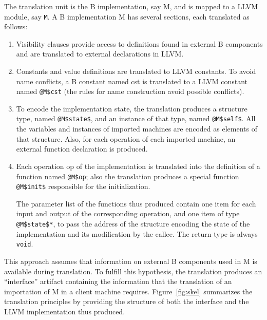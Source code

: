 \documentclass{llncs}
\newcommand{\llvm}[1]{\texttt{#1}}
\newcommand{\B}[1]{\textsf{#1}}
\begin{document}
The translation unit is the B implementation, say \B{M}, and is mapped to a LLVM
module, say \llvm{M}. A B implementation \B{M} has several sections, each
translated as follows:
\begin{enumerate}
\item Visibility clauses provide access to definitions found in external
  B components and are translated to external declarations in LLVM.
\item Constants and value definitions are translated to LLVM constants. To avoid
  name conflicts, a B constant named \B{cst} is translated to a LLVM constant
  named \llvm{@M\$cst} (the rules for name construction avoid possible conflicts).
\item To encode the implementation state, the translation produces a
  structure type, named \llvm{@M\$state\$}, and an instance of that type, named
  \llvm{@M\$self\$}. All the variables and instances of imported machines
  are encoded as elements of that structure.  Also, for each operation of each
  imported machine, an external function declaration is produced.
\item Each operation \B{op} of the implementation is translated into the
  definition of a function named \llvm{@M\$op}; also the translation produces a
  special function \llvm{@M\$init\$} responsible for the initialization.

  The parameter list of the functions thus produced contain one item for each
  input and output of the corresponding operation, and one item of type
  \llvm{@M\$state\$*}, to pass the address of the structure encoding the
  state of the implementation and its modification by the callee. The return
  type is always \llvm{void}.
\end{enumerate}
This approach assumes that information on external B components used in \B{M} is
available during translation. To fulfill this hypothesis, the translation
produces an ``interface'' artifact containing the information that the
translation of an importation of \B{M} in a client machine
requires. Figure~\ref{fig:skel} summarizes the translation principles by
providing the structure of both the interface and the LLVM implementation thus
produced.
\end{document}
